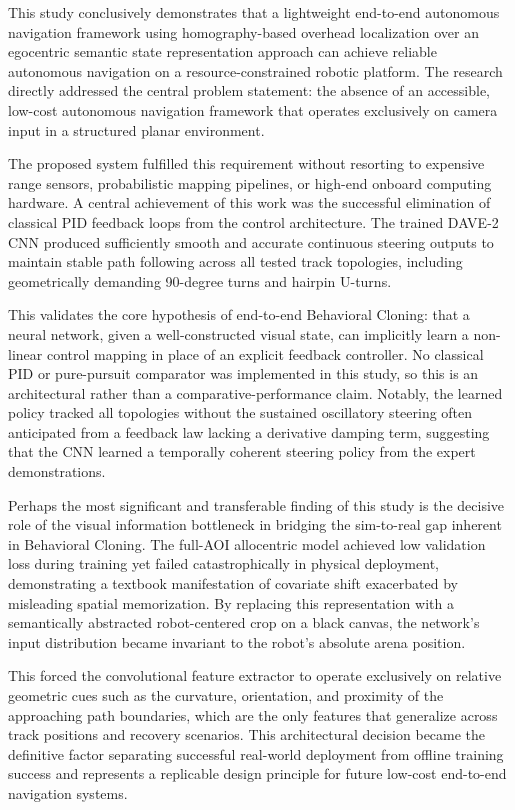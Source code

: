This study conclusively demonstrates that a lightweight end-to-end autonomous navigation framework using homography-based overhead localization over an egocentric semantic state representation approach can achieve reliable autonomous navigation on a resource-constrained robotic platform. The research directly addressed the central problem statement: the absence of an accessible, low-cost autonomous navigation framework that operates exclusively on camera input in a structured planar environment.

The proposed system fulfilled this requirement without resorting to expensive range sensors, probabilistic mapping pipelines, or high-end onboard computing hardware. A central achievement of this work was the successful elimination of classical PID feedback loops from the control architecture. The trained DAVE-2 CNN produced sufficiently smooth and accurate continuous steering outputs to maintain stable path following across all tested track topologies, including geometrically demanding 90-degree turns and hairpin U-turns.

This validates the core hypothesis of end-to-end Behavioral Cloning: that a neural network, given a well-constructed visual state, can implicitly learn a non-linear control mapping in place of an explicit feedback controller. No classical PID or pure-pursuit comparator was implemented in this study, so this is an architectural rather than a comparative-performance claim. Notably, the learned policy tracked all topologies without the sustained oscillatory steering often anticipated from a feedback law lacking a derivative damping term, suggesting that the CNN learned a temporally coherent steering policy from the expert demonstrations.

Perhaps the most significant and transferable finding of this study is the decisive role of the visual information bottleneck in bridging the sim-to-real gap inherent in Behavioral Cloning. The full-AOI allocentric model achieved low validation loss during training yet failed catastrophically in physical deployment, demonstrating a textbook manifestation of covariate shift exacerbated by misleading spatial memorization. By replacing this representation with a semantically abstracted robot-centered crop on a black canvas, the network's input distribution became invariant to the robot's absolute arena position.

This forced the convolutional feature extractor to operate exclusively on relative geometric cues such as the curvature, orientation, and proximity of the approaching path boundaries, which are the only features that generalize across track positions and recovery scenarios. This architectural decision became the definitive factor separating successful real-world deployment from offline training success and represents a replicable design principle for future low-cost end-to-end navigation systems.

